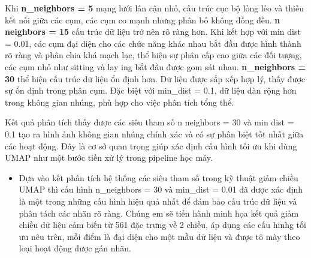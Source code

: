 \documentclass[
]{article}
\providecommand{\tightlist}{%
  \setlength{\itemsep}{0pt}\setlength{\parskip}{0pt}}
\begin{document}
Khi \textbf{n\_neighbors = 5} mạng lưới lân cận nhỏ, cấu trúc cục bộ
lỏng lẻo và thiếu kết nối giữa các cụm, các cụm co mạnh nhưng phân bố
không đồng đều. \textbf{n neighbors = 15} cấu trúc dữ liệu trở nên rõ
ràng hơn. Khi kết hợp với min dist = 0.01, các cụm đại diện cho các chức
năng khác nhau bắt đầu được hình thành rõ ràng và phân chia khá mạch
lạc, thể hiện sự phân cấp cao giữa các đối tượng, các cụm nhỏ như
sitting và lay ing bắt đầu được gom sát nhau. \textbf{n\_neighbors = 30}
thể hiện cấu trúc dữ liệu ổn định hơn. Dữ liệu được sắp xếp hợp lý, thấy
được sự ổn định trong phân cụm. Đặc biệt với min\_dist = 0.1, dữ liệu
dàn rộng hơn trong không gian nhúng, phù hợp cho việc phân tích tổng
thể.

Kết quả phân tích thấy được các siêu tham số n neighbors = 30 và min
dist = 0.1 tạo ra hình ảnh không gian nhúng chính xác và có sự phân biệt
tốt nhất giữa các hoạt động. Đây là cơ sở quan trọng giúp xác định cấu
hình tối ưu khi dùng UMAP như một bước tiền xử lý trong pipeline học
máy.

\begin{itemize}
\tightlist
\item
  Dựa vào kết phân tích hệ thống các siêu tham số trong kỹ thuật giảm
  chiều UMAP thì cấu hình n\_neighbors = 30 và min\_dist = 0.01 đã được
  xác định là một trong những cấu hình hiệu quả nhất để đảm bảo cấu trúc
  dữ liệu và phân tách các nhãn rõ ràng. Chúng em sẽ tiến hành minh họa
  kết quả giảm chiều dữ liệu cảm biến từ 561 đặc trưng về 2 chiều, áp
  dụng các cấu hinhg tối ưu nêu trên, mỗi điểm là đại diện cho một mẫu
  dữ liệu và được tô mày theo loại hoạt động được gán nhãn.
\end{itemize}
\end{document}
